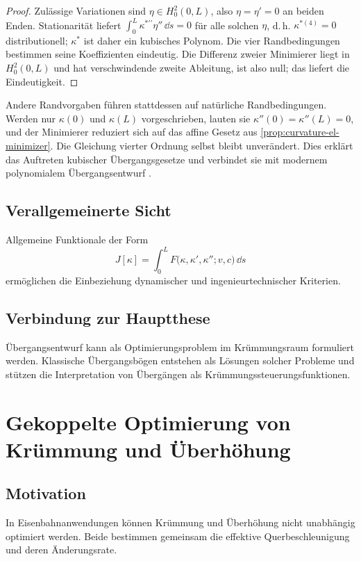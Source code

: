 \begin{proof}
Zulässige Variationen sind \(\eta\in H_0^2(0,L)\), also \(\eta=\eta'=0\) an
beiden Enden. Stationarität liefert
\(\int_0^L\kappa^{\ast\prime\prime}\eta''\,\dd s=0\) für alle solchen
\(\eta\), d.\,h. \(\kappa^{\ast(4)}=0\) distributionell; \(\kappa^\ast\)
ist daher ein kubisches Polynom. Die vier Randbedingungen bestimmen seine
Koeffizienten eindeutig. Die Differenz zweier Minimierer liegt in
\(H_0^2(0,L)\) und hat verschwindende zweite Ableitung, ist also null; das
liefert die Eindeutigkeit.
\end{proof}

Andere Randvorgaben führen stattdessen auf natürliche Randbedingungen.
Werden nur \(\kappa(0)\) und \(\kappa(L)\) vorgeschrieben, lauten sie
\(\kappa''(0)=\kappa''(L)=0\), und der Minimierer reduziert sich auf das
affine Gesetz aus \cref{prop:curvature-el-minimizer}. Die Gleichung vierter
Ordnung selbst bleibt unverändert.
Dies erklärt das Auftreten kubischer Übergangsgesetze und verbindet sie mit
modernem polynomialem Übergangsentwurf
\cite{ZboinskiWoznica2017Polynomial}.

\subsection{Verallgemeinerte Sicht}
Allgemeine Funktionale der Form
\[
J[\kappa]=\int_0^L
F\bigl(\kappa,\kappa',\kappa'';v,c\bigr)\,\dd s
\]
ermöglichen die Einbeziehung dynamischer und ingenieurtechnischer Kriterien.

\subsection{Verbindung zur Hauptthese}
\begin{summary}
Übergangsentwurf kann als Optimierungsproblem im Krümmungsraum formuliert
werden. Klassische Übergangsbögen entstehen als Lösungen solcher Probleme und
stützen die Interpretation von Übergängen als Krümmungssteuerungsfunktionen.
\end{summary}

\section{Gekoppelte Optimierung von Krümmung und Überhöhung}

\subsection{Motivation}
In Eisenbahnanwendungen können Krümmung und Überhöhung nicht unabhängig
optimiert werden. Beide bestimmen gemeinsam die effektive Querbeschleunigung
und deren Änderungsrate.

